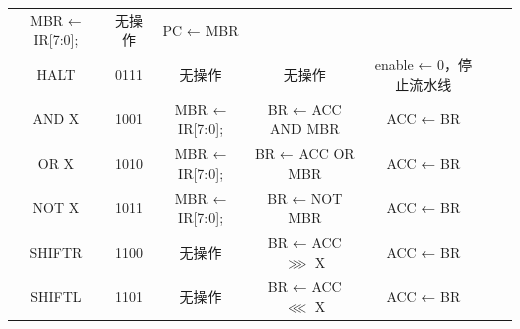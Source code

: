 \documentclass[lang=cn,a4paper,newtx]{elegantpaper}
\begin{document}
\begin{longtable}{ccccccl}
  MBR ← IR[7:0]; &
  无操作 & 
  PC ← MBR \\

  HALT & 0111 &
  
  无操作 &
  无操作 & 
  enable ← 0，停止流水线 \\

  
  \midrule
  AND X & 1001 &
  
  MBR ← IR[7:0]; &
  BR ← ACC AND MBR &
  ACC ← BR \\

  OR X & 1010 &
  
  MBR ← IR[7:0];  &
  BR ← ACC OR MBR &
  ACC ← BR \\

  NOT X & 1011 &
  
  MBR ← IR[7:0];&
  BR ← NOT MBR &
  ACC ← BR \\

  SHIFTR & 1100 &
  
  无操作 &
  BR ← ACC $\ggg $ X &
  ACC ← BR \\

  SHIFTL & 1101 &
  
  无操作 &
  BR ← ACC $\lll$ X &
  ACC ← BR \\

\end{longtable}
\end{document}
